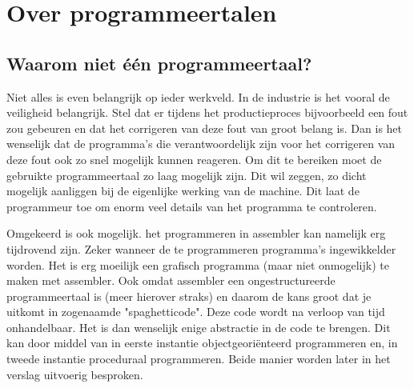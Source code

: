 \documentclass[11pt,a4paper]{article}
\begin{document}
\section{Over programmeertalen}

\subsection{Waarom niet één programmeertaal?}
Niet alles is even belangrijk op ieder werkveld. In de industrie is het vooral de veiligheid belangrijk. Stel dat er tijdens het productieproces bijvoorbeeld een fout zou gebeuren en dat het corrigeren van deze fout van groot belang is. Dan is het wenselijk dat de programma's die verantwoordelijk zijn voor het corrigeren van deze fout ook zo snel mogelijk kunnen reageren. Om dit te bereiken moet de gebruikte programmeertaal zo laag mogelijk zijn. Dit wil zeggen, zo dicht mogelijk aanliggen bij de eigenlijke werking van de machine. Dit laat de programmeur toe om enorm veel details van het programma te controleren.

Omgekeerd is ook mogelijk. het programmeren in assembler kan namelijk erg tijdrovend zijn. Zeker wanneer de te programmeren programma's ingewikkelder worden. Het is erg moeilijk een grafisch programma (maar niet onmogelijk) te maken met assembler. Ook omdat assembler een ongestructureerde programmeertaal is (meer hierover straks) en daarom de kans groot dat je uitkomt in zogenaamde "spaghetticode". Deze code wordt na verloop van tijd onhandelbaar. Het is dan wenselijk enige abstractie in de code te brengen. Dit kan door middel van in eerste instantie objectgeoriënteerd programmeren en, in tweede instantie proceduraal programmeren. Beide manier worden later in het verslag uitvoerig besproken.
\end{document}
